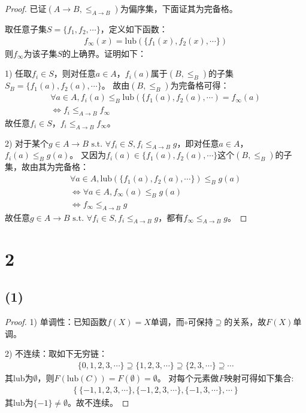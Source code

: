 \documentclass[12pt]{article}
\newcommand{\leqab}{\leq_{A \to B}}
\newcommand{\leqb}{\leq_B}
\newcommand{\st}{\textrm{ s.t. }}
\newcommand{\lub}{\textrm{lub}}
\begin{document}
    \begin{proof}
      已证$(A \to B, \leqab)$为偏序集，下面证其为完备格。

      取任意子集$S=\{f_1,f_2,\cdots\}$，定义如下函数：
      \begin{gather}
        f_\infty(x) = \lub(\{f_1(x), f_2(x), \cdots\})
      \end{gather}
      则$f_\infty$为该子集$S$的上确界。证明如下：

      1) 任取$f_i \in S$，则对任意$a \in A$，$f_i(a)$属于$(B,\leqb)$的子集$S_B=\{f_1(a),f_2(a),\cdots\}$。
         故由$(B,\leqb)$为完备格可得：
         \begin{gather}
           \forall a \in A, f_i(a) \leqb \lub(\{f_1(a),f_2(a),\cdots) = f_\infty(a) \\
           \Leftrightarrow f_i \leqab f_\infty
         \end{gather}
         故任意$f_i \in S$，$f_i \leqab f_\infty$。

      2) 对于某个$g \in A \to B \st \forall f_i \in S, f_i \leqab g$，即对任意$a \in A$，$f_i(a) \leqb g(a)$。
         又因为$f_i(a) \in \{f_1(a),f_2(a),\cdots\}$这个$(B,\leqb)$的子集，故由其为完备格：
         \begin{gather}
           \forall a \in A, \lub(\{f_1(a),f_2(a),\cdots\}) \leqb g(a) \\
           \Leftrightarrow \forall a \in A, f_\infty(a) \leqb g(a) \\
           \Leftrightarrow f_\infty \leqab g
         \end{gather}
         故任意$g \in A \to B \st \forall f_i \in S, f_i \leqab g$，都有$f_\infty \leqab g$。
    \end{proof}

  \section*{2}

    \subsection*{(1)}

      \begin{proof}
        1) 单调性：已知函数$f(X)=X$单调，而$\circ$可保持$\supseteq$的关系，故$F(X)$单调。

        2) 不连续：取如下无穷链：
           \begin{gather}
             \{0,1,2,3,\cdots\} \supseteq \{1,2,3,\cdots\} \supseteq \{2,3,\cdots\} \supseteq \cdots
           \end{gather}
           其$\lub$为$\emptyset$，则$F(\lub(C))=F(\emptyset)=\emptyset$。
           对每个元素做$F$映射可得如下集合:
           \begin{gather}
             \left\{\{-1,1,2,3,\cdots\}, \{-1,2,3,\cdots\}, \{-1,3,\cdots\}, \cdots \right\}
           \end{gather}
           其$\lub$为$\{-1\} \neq \emptyset$。故不连续。
      \end{proof}
\end{document}
